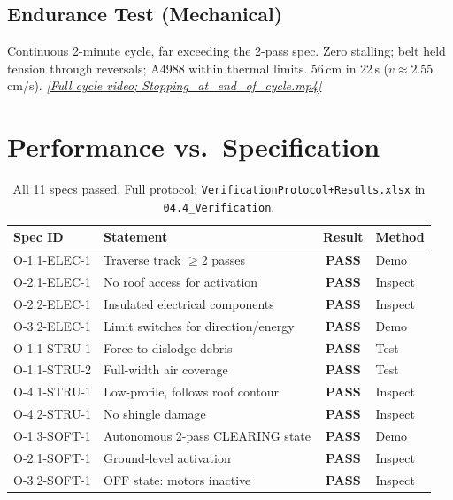 \documentclass[12pt, letterpaper]{article}
\begin{document}
\subsection{Endurance Test (Mechanical)}
Continuous 2-minute cycle, far exceeding the 2-pass spec. Zero stalling; belt held tension through reversals; A4988 within thermal limits. 56\,cm in 22\,s ($v \approx 2.55$\,cm/s). \href{https://drive.google.com/drive/folders/1wNK_jYUvHXoMne_cIdYbAIURdvYpuG-J}{\textit{[Full cycle video; Stopping\_at\_end\_of\_cycle.mp4]}}

\section{Performance vs.\ Specification}

\vspace{-2pt}
\begin{table}[H]
\centering\small
\caption{All 11 specs passed. Full protocol: \texttt{VerificationProtocol+Results.xlsx} in \texttt{04.4\_Verification}.}
\label{tab:specs}
\begin{tabularx}{\textwidth}{@{}l X c l@{}}
\toprule
\textbf{Spec ID} & \textbf{Statement} & \textbf{Result} & \textbf{Method} \\
\midrule
O-1.1-ELEC-1 & Traverse track $\geq$2 passes                      & \textcolor{green!50!black}{\textbf{PASS}} & Demo \\
O-2.1-ELEC-1 & No roof access for activation                       & \textcolor{green!50!black}{\textbf{PASS}} & Inspect \\
O-2.2-ELEC-1 & Insulated electrical components                     & \textcolor{green!50!black}{\textbf{PASS}} & Inspect \\
O-3.2-ELEC-1 & Limit switches for direction/energy                 & \textcolor{green!50!black}{\textbf{PASS}} & Demo \\
O-1.1-STRU-1 & Force to dislodge debris                            & \textcolor{green!50!black}{\textbf{PASS}} & Test \\
O-1.1-STRU-2 & Full-width air coverage                             & \textcolor{green!50!black}{\textbf{PASS}} & Test \\
O-4.1-STRU-1 & Low-profile, follows roof contour                   & \textcolor{green!50!black}{\textbf{PASS}} & Inspect \\
O-4.2-STRU-1 & No shingle damage                                   & \textcolor{green!50!black}{\textbf{PASS}} & Inspect \\
O-1.3-SOFT-1 & Autonomous 2-pass CLEARING state                    & \textcolor{green!50!black}{\textbf{PASS}} & Demo \\
O-2.1-SOFT-1 & Ground-level activation                              & \textcolor{green!50!black}{\textbf{PASS}} & Inspect \\
O-3.2-SOFT-1 & OFF state: motors inactive                           & \textcolor{green!50!black}{\textbf{PASS}} & Inspect \\
\bottomrule
\end{tabularx}
\end{table}
\end{document}
